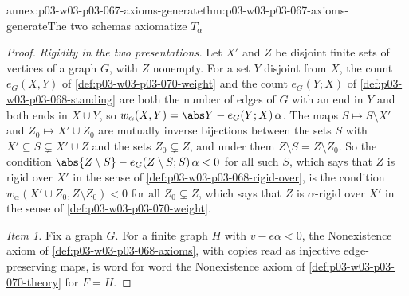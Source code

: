 \begin{annexitem}{annex:p03-w03-p03-067-axioms-generate}{thm:p03-w03-p03-067-axioms-generate}{The two schemas axiomatize \(T_\alpha\)}
\begin{proof}
\emph{Rigidity in the two presentations.}  Let \(X'\) and \(Z\) be disjoint
finite sets of vertices of a graph \(G\), with \(Z\) nonempty.  For a set
\(Y\) disjoint from \(X\), the count \(e_G(X,Y)\) of
\cref{def:p03-w03-p03-070-weight} and the count \(e_G(Y;X)\) of
\cref{def:p03-w03-p03-068-standing} are both the number of edges of \(G\)
with an end in \(Y\) and both ends in \(X\cup Y\), so
\(w_\alpha(X,Y)=\abs Y-e_G(Y;X)\,\alpha\).  The maps \(S\mapsto S\setminus
X'\) and \(Z_0\mapsto X'\cup Z_0\) are mutually inverse bijections between
the sets \(S\) with \(X'\subseteq S\subsetneq X'\cup Z\) and the sets
\(Z_0\subsetneq Z\), and under them \(Z\setminus S=Z\setminus Z_0\).  So the
condition \(\abs{Z\setminus S}-e_G(Z\setminus S;S)\,\alpha<0\) for all such
\(S\), which says that \(Z\) is rigid over \(X'\) in the sense of
\cref{def:p03-w03-p03-068-rigid-over}, is the condition
\(w_\alpha(X'\cup Z_0,Z\setminus Z_0)<0\) for all \(Z_0\subsetneq Z\), which
says that \(Z\) is \(\alpha\)-rigid over \(X'\) in the sense of
\cref{def:p03-w03-p03-070-weight}.

\emph{Item 1.}  Fix a graph \(G\).  For a finite graph \(H\) with
\(v-e\alpha<0\), the Nonexistence axiom of
\cref{def:p03-w03-p03-068-axioms}, with copies read as injective
edge-preserving maps, is word for word the Nonexistence axiom of
\cref{def:p03-w03-p03-070-theory} for \(F=H\).


\end{proof}
\end{annexitem}
